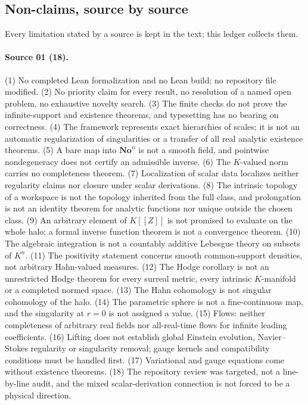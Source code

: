 \documentclass[11pt,letterpaper]{article}
\theoremstyle{definition}
\theoremstyle{remark}
\newcommand{\No}{\mathbf{No}}
\begin{document}
\subsection{Non-claims, source by source}\label{vtf:subsec:nonclaims}

Every limitation stated by a source is kept in the text; this ledger collects
them.

\paragraph{Source 01 (18).}
(1) No completed Lean formalization and no Lean build; no repository file
modified. (2) No priority claim for every result, no resolution of a named open
problem, no exhaustive novelty search. (3) The finite checks do not prove the
infinite-support and existence theorems, and typesetting has no bearing on
correctness. (4) The framework represents exact hierarchies of scales; it is not
an automatic regularization of singularities or a transfer of all real analytic
existence theorems. (5) A bare map into $\No^n$ is not a smooth field, and
pointwise nondegeneracy does not certify an admissible inverse. (6) The
$K$-valued norm carries no completeness theorem. (7) Localization of scalar data
localizes neither regularity claims nor closure under scalar derivations.
(8) The intrinsic topology of a workspace is not the topology inherited from the
full class, and prolongation is not an identity theorem for analytic functions
nor unique outside the chosen class. (9) An arbitrary element of $K[[Z]]$ is not
promised to evaluate on the whole halo; a formal inverse function theorem is not
a convergence theorem. (10) The algebraic integration is not a countably
additive Lebesgue theory on subsets of $K^n$. (11) The positivity statement
concerns smooth common-support densities, not arbitrary Hahn-valued measures.
(12) The Hodge corollary is not an unrestricted Hodge theorem for every surreal
metric, every intrinsic $K$-manifold or a completed normed space. (13) The Hahn
cohomology is not singular cohomology of the halo. (14) The parametric sphere is
not a fine-continuous map, and the singularity at $r=0$ is not assigned a value.
(15) Flows: neither completeness of arbitrary real fields nor all-real-time flows
for infinite leading coefficients. (16) Lifting does not establish global
Einstein evolution, Navier--Stokes regularity or singularity removal; gauge
kernels and compatibility conditions must be handled first. (17) Variational and
gauge equations come without existence theorems. (18) The repository review was
targeted, not a line-by-line audit, and the mixed scalar-derivation connection
is not forced to be a physical direction.
\end{document}
